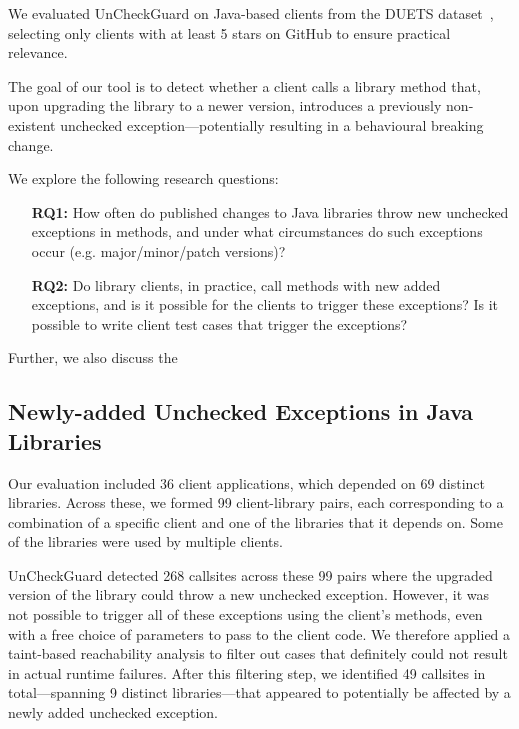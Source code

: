 We evaluated UnCheckGuard on Java-based clients from the DUETS dataset~\cite{durieux21:_duets}, selecting only clients with at least 5 stars on GitHub to ensure practical relevance.

The goal of our tool is to detect whether a client calls a library method that, upon upgrading the library to a newer version, introduces a previously non-existent unchecked exception—potentially resulting in a behavioural breaking change.

We explore the following research questions:

\begin{itemize}
  \item[\textbf{RQ1:}] How often do published changes to Java libraries throw new unchecked exceptions in methods,
and under what circumstances do such exceptions occur (e.g. major/minor/patch versions)?
  \item[\textbf{RQ2:}]  Do library clients, in practice, call methods with new added exceptions, and is it possible for the clients to trigger these exceptions? Is it possible to write client test cases that trigger the exceptions?
\end{itemize}


Further, we also discuss the 

\subsection{Newly-added Unchecked Exceptions in Java Libraries}

Our evaluation included 36 client applications, which depended on 69 distinct libraries. Across these, we formed 99 client-library pairs, each corresponding to a combination of a specific client and one of the libraries that it depends on. Some of the libraries were used by multiple clients.



UnCheckGuard detected 268 callsites across these 99 pairs where the upgraded version of the library could throw a new unchecked exception. However, it was not possible to trigger all of these exceptions using the client's methods, even with a free choice of parameters to pass to the client code. We therefore applied a taint-based reachability analysis to filter out cases that definitely could not result in actual runtime failures. After this filtering step, we identified 49 callsites in total—spanning 9 distinct libraries—that appeared to potentially be affected by a newly added unchecked exception.

